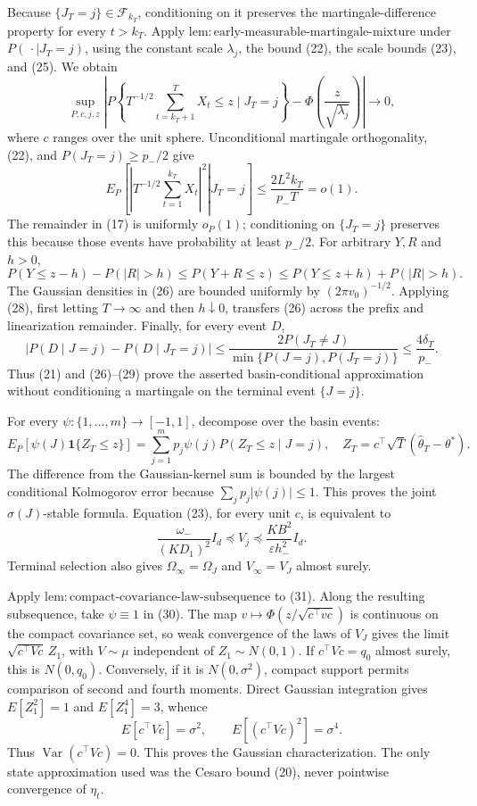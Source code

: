 Because \(\{J_T=j\}\in\mathcal F_{k_T}\), conditioning on it preserves the martingale-difference property for every \(t>k_T\). Apply \(\mathrm{lem:early\text{-}measurable\text{-}martingale\text{-}mixture}\) under \(P(\,\cdot\mid J_T=j)\), using the constant scale \(\lambda_j\), the bound (22), the scale bounds (23), and (25). We obtain
\[
 \sup_{P,c,j,z}\left|P\!\left\{T^{-1/2}\sum_{t=k_T+1}^TX_t\le z
 \mid J_T=j\right\}
 -\Phi\!\left(\frac z{\sqrt{\lambda_j}}\right)\right|\longrightarrow0,
\tag{26}
\]
where \(c\) ranges over the unit sphere. Unconditional martingale orthogonality, (22), and \(P(J_T=j)\ge p_-/2\) give
\[
 E_P\!\left[\left.\left|T^{-1/2}\sum_{t=1}^{k_T}X_t\right|^2
 \right|J_T=j\right]
 \le\frac{2L^2k_T}{p_-T}=o(1).
\tag{27}
\]
The remainder in (17) is uniformly \(o_P(1)\); conditioning on \(\{J_T=j\}\) preserves this because those events have probability at least \(p_-/2\). For arbitrary \(Y,R\) and \(h>0\),
\[
 P(Y\le z-h)-P(|R|>h)\le P(Y+R\le z)
 \le P(Y\le z+h)+P(|R|>h).
\tag{28}
\]
The Gaussian densities in (26) are bounded uniformly by \((2\pi v_0)^{-1/2}\). Applying (28), first letting \(T\to\infty\) and then \(h\downarrow0\), transfers (26) across the prefix and linearization remainder. Finally, for every event \(D\),
\[
 \left|P(D\mid J=j)-P(D\mid J_T=j)\right|
 \le\frac{2P(J_T\ne J)}{\min\{P(J=j),P(J_T=j)\}}
 \le\frac{4\delta_T}{p_-}.
\tag{29}
\]
Thus (21) and (26)--(29) prove the asserted basin-conditional approximation without conditioning a martingale on the terminal event \(\{J=j\}\).

For every \(\psi:\{1,\ldots,m\}\to[-1,1]\), decompose over the basin events:
\[
 E_P[\psi(J)\mathbf1\{Z_T\le z\}]
 =\sum_{j=1}^mp_j\psi(j)P(Z_T\le z\mid J=j),
 \quad Z_T=c^\top\sqrt T(\widehat\theta_T-\theta^*).
\tag{30}
\]
The difference from the Gaussian-kernel sum is bounded by the largest conditional Kolmogorov error because \(\sum_jp_j|\psi(j)|\le1\). This proves the joint \(\sigma(J)\)-stable formula. Equation (23), for every unit \(c\), is equivalent to
\[
 \frac{\omega_-}{(KD_1)^2}I_d\preceq V_j
 \preceq\frac{KB^2}{\varepsilon h_-^2}I_d.
\tag{31}
\]
Terminal selection also gives \(\Omega_\infty=\Omega_J\) and \(V_\infty=V_J\) almost surely.

Apply \(\mathrm{lem:compact\text{-}covariance\text{-}law\text{-}subsequence}\) to (31). Along the resulting subsequence, take \(\psi\equiv1\) in (30). The map \(v\mapsto\Phi(z/\sqrt{c^\top vc})\) is continuous on the compact covariance set, so weak convergence of the laws of \(V_J\) gives the limit \(\sqrt{c^\top Vc}\,Z_1\), with \(V\sim\mu\) independent of \(Z_1\sim N(0,1)\). If \(c^\top Vc=q_0\) almost surely, this is \(N(0,q_0)\). Conversely, if it is \(N(0,\sigma^2)\), compact support permits comparison of second and fourth moments. Direct Gaussian integration gives \(E[Z_1^2]=1\) and \(E[Z_1^4]=3\), whence
\[
 E[c^\top Vc]=\sigma^2,
 \qquad E[(c^\top Vc)^2]=\sigma^4.
\tag{32}
\]
Thus \(\operatorname{Var}(c^\top Vc)=0\). This proves the Gaussian characterization. The only state approximation used was the Cesaro bound (20), never pointwise convergence of \(\eta_t\).


